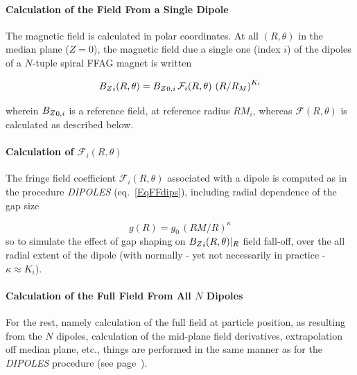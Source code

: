\medskip


\paragraph{Calculation of the Field From a Single Dipole} 

 \noindent The magnetic field is calculated in  polar
coordinates.  At all $(R,\theta)$ in the median plane ($Z=0$), the 
magnetic field  due  a single one (index $i$) of the  dipoles  of a $N$-tuple spiral FFAG  magnet is written 

$$ {B_Z}_i(R,\theta) =  {B_Z}_{0,i} \, \mathcal{F}_i(R,\theta) \, \left(   R/R_M \right)^{K_i}  $$

\noindent wherein ${B_Z}_{0,i}$  is a reference field, at reference radius  $RM_{i}$, 
 whereas $ \mathcal{F}(R,\theta)$ is calculated as described below. 



\paragraph{Calculation of $\mathcal{F}_i(R,\theta) $} 

\noindent The fringe field coefficient  $\mathcal{F}_i(R,\theta) $ associated with a  dipole is computed as in the 
procedure  \textsl{DIPOLES} (eq.~\ref{EqFFdips}), including  radial dependence of the gap size 

\begin{equation}
g(R) = g_0 \, (RM/R)^{\kappa}
\end{equation}
%
\noindent  so to simulate the effect of gap shaping on $ {B_Z}_i(R,\theta)|_R$ 
field fall-off,  over the 
all radial extent of the  dipole (with normally - yet not necessarily in practice - $\kappa \approx K_i$). 
 

\medskip

\paragraph{Calculation of the Full Field From All $N$ Dipoles}

For the rest, namely calculation of the full field at particle position, as resulting from the $N$ dipoles,  
  calculation of the  mid-plane field derivatives, 
extrapolation off median plane, etc., things are performed in the same manner  as for the 
 \textsl{DIPOLES} procedure (see page~\pageref{FFatAP}). 





